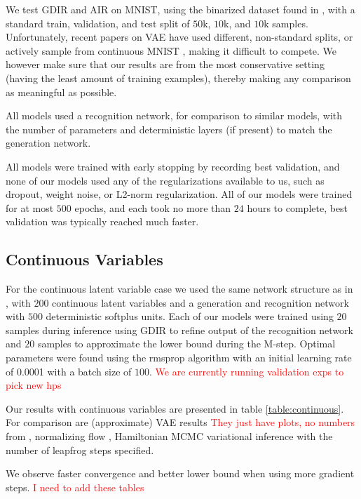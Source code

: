 \documentclass{article} %
\newcommand{\alert}[1]{\textcolor{red}{#1}}
\begin{document}
We test GDIR and AIR on MNIST, using the binarized dataset found in \citep{salakhutdinov2008quantitative}, with a standard train, validation, and test split of $50$k, $10$k, and $10$k samples. Unfortunately, recent papers on VAE \citep{mnih2014neural, salimans2014markov} have used different, non-standard splits, or actively sample from continuous MNIST \citep{burda2015importance}, making it difficult to compete. We however make sure that our results are from the most conservative setting (having the least amount of training examples), thereby making any comparison as meaningful as possible.

All models used a recognition network, for comparison to similar models, with the number of parameters and deterministic layers (if present) to match the generation network.

All models were trained with early stopping by recording best validation, and none of our models used any of the regularizations available to us, such as dropout, weight noise, or L2-norm regularization. All of our models were trained for at most $500$ epochs, and each took no more than $24$ hours to complete, best validation was typically reached much faster.

\subsection{Continuous Variables}
For the continuous latent variable case we used the same network structure as in \citep{kingma2013auto, salimans2014markov}, with $200$ continuous latent variables and a generation and recognition network with $500$ deterministic softplus units. Each of our models were trained using $20$ samples during inference using GDIR to refine output of the recognition network and $20$ samples to approximate the lower bound during the M-step. Optimal parameters were found using the rmsprop algorithm \citep{Hinton-Coursera2012} with an initial learning rate of \num{0.0001} with a batch size of $100$. \alert{We are currently running validation exps to pick new hps}

Our results with continuous variables are presented in table \ref{table:continuous}. For comparison are (approximate) VAE results \alert{They just have plots, no numbers} from \citep{kingma2013auto}, normalizing flow \citep{rezende2015variational}, Hamiltonian MCMC variational inference \citep{salimans2014markov} with the number of leapfrog steps specified.

We observe faster convergence and better lower bound when using more gradient steps. \alert{I need to add these tables}
\end{document}
